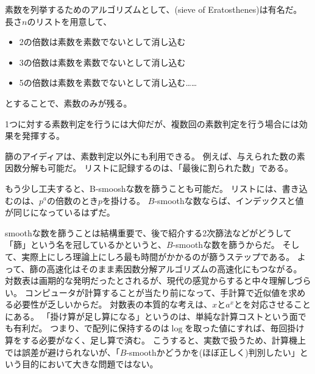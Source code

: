 素数を列挙するためのアルゴリズムとして、(sieve of Eratosthenes)は有名だ。
長さ$n$のリストを用意して、
\begin{itemize}
 \item 2の倍数は素数を素数でないとして消し込む
 \item 3の倍数は素数を素数でないとして消し込む
 \item 5の倍数は素数を素数でないとして消し込む……
\end{itemize}
とすることで、素数のみが残る。


1つに対する素数判定を行うには大仰だが、複数回の素数判定を行う場合には効果を発揮する。

篩のアイディアは、素数判定以外にも利用できる。
例えば、与えられた数の素因数分解も可能だ。
リストに記録するのは、「最後に割られた数」である。


もう少し工夫すると、B-smooshな数を篩うことも可能だ。
リストには、書き込むのは、$p^a$の倍数のとき$p$を掛ける。
$B$-smoothな数ならば、インデックスと値が同じになっているはずだ。


smoothな数を篩うことは結構重要で、後で紹介する2次篩法などがどうして「篩」という名を冠しているかというと、$B$-smoothな数を篩うからだ。
そして、実際上にしろ理論上にしろ最も時間がかかるのが篩うステップである。
よって、篩の高速化はそのまま素因数分解アルゴリズムの高速化にもつながる。
対数表は画期的な発明だったとされるが、現代の感覚からすると中々理解しづらい。
コンピュータが計算することが当たり前になって、手計算で近似値を求める必要性が乏しいからだ。
対数表の本質的な考えは、$x$と$a^x$とを対応させることにある。
「掛け算が足し算になる」というのは、単純な計算コストという面でも有利だ。
つまり、で配列に保持するのは$\log$を取った値にすれば、毎回掛け算をする必要がなく、足し算で済む。
こうすると、実数で扱うため、計算機上では誤差が避けられないが、「$B$-smoothかどうかを(ほぼ正しく)判別したい」という目的において大きな問題ではない。

